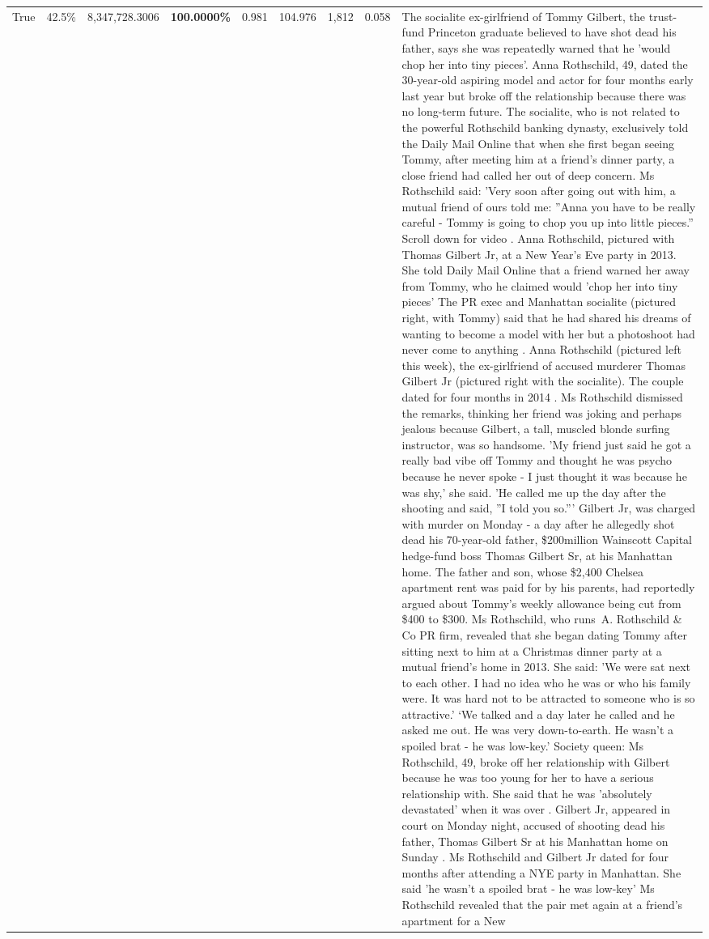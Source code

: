 \begin{table}[H]
\begin{tabular}{lllrlllll}
True & 42.5\% & 8,347,728.3006 & \bfseries \color{red} 100.0000\% & 0.981 & 104.976 & 1,812 & 0.058 & The socialite ex-girlfriend of Tommy Gilbert, the trust-fund Princeton graduate believed to have shot dead his father, says she was repeatedly warned that he 'would chop her into tiny pieces'. Anna Rothschild, 49, dated the 30-year-old aspiring model and actor for four months early last year but broke off the relationship because there was no long-term future. The socialite, who is not related to the powerful Rothschild banking dynasty, exclusively told the Daily Mail Online that when she first began seeing Tommy, after meeting him at a friend's dinner party, a close friend had called her out of deep concern. Ms Rothschild said: 'Very soon after going out with him, a mutual friend of ours told me: ''Anna you have to be really careful - Tommy is going to chop you up into little pieces.'' Scroll down for video . Anna Rothschild, pictured with Thomas Gilbert Jr, at a New Year's Eve party in 2013. She told Daily Mail Online that a friend warned her away from Tommy, who he claimed would 'chop her into tiny pieces' The PR exec and Manhattan socialite (pictured right, with Tommy) said that he had shared his dreams of wanting to become a model with her but a photoshoot had never come to anything . Anna Rothschild (pictured left this week), the ex-girlfriend of accused murderer Thomas Gilbert Jr (pictured right with the socialite). The couple dated for four months in 2014 . Ms Rothschild dismissed the remarks, thinking her friend was joking and perhaps jealous because Gilbert, a tall, muscled blonde surfing instructor, was so handsome. 'My friend just said he got a really bad vibe off Tommy and thought he was psycho because he never spoke - I just thought it was because he was shy,' she said. 'He called me up the day after the shooting and said, ''I told you so.''' Gilbert Jr, was charged with murder on Monday - a day after he allegedly shot dead his 70-year-old father, \$200million Wainscott Capital hedge-fund boss Thomas Gilbert Sr, at his Manhattan home. The father and son, whose \$2,400 Chelsea apartment rent was paid for by his parents, had reportedly argued about Tommy's weekly allowance being cut from \$400 to \$300. Ms Rothschild, who runs A. Rothschild \& Co PR firm, revealed that she began dating Tommy after sitting next to him at a Christmas dinner party at a mutual friend's home in 2013. She said: 'We were sat next to each other. I had no idea who he was or who his family were. It was hard not to be attracted to someone who is so attractive.' ‘We talked and a day later he called and he asked me out. He was very down-to-earth. He wasn’t a spoiled brat - he was low-key.’ Society queen: Ms Rothschild, 49, broke off her relationship with Gilbert because he was too young for her to have a serious relationship with. She said that he was 'absolutely devastated' when it was over . Gilbert Jr, appeared in court on Monday night, accused of shooting dead his father, Thomas Gilbert Sr at his Manhattan home on Sunday . Ms Rothschild and Gilbert Jr dated for four months after attending a NYE party in Manhattan. She said 'he wasn't a spoiled brat - he was low-key' Ms Rothschild revealed that the pair met again at a friend’s apartment for a New 
\end{tabular}
\end{table}
